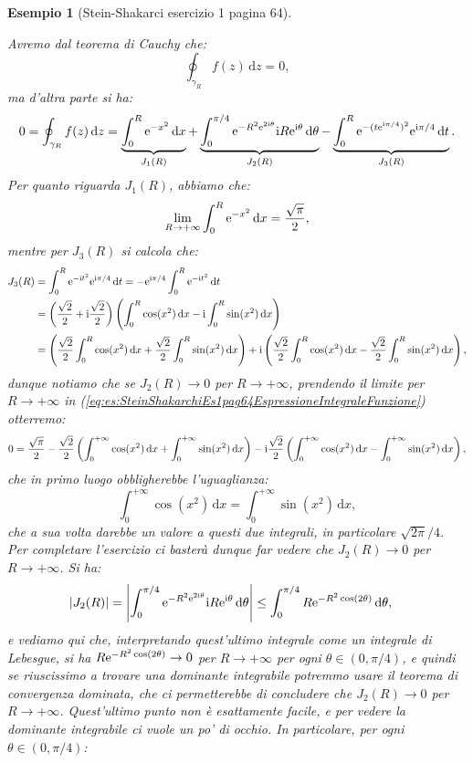 \documentclass[11pt]{book}
\theoremstyle{Definizione}
\theoremstyle{TeoremaProposizioneLemmaCorollarioCongettura}
\theoremstyle{OsservazioneNotaEsempio}
\newtheorem{myes}{Esempio}[section]
\renewcommand{\i}{\textup{i}}
\newcommand{\e}{\textup{e}}
\renewcommand{\d}{\mathrm{d}}
\newcommand{\dz}{\,\d z}
\newcommand{\dt}{\,\d t}
\newcommand{\dx}{\,\d x}
\newcommand{\dtheta}{\, \d \theta}
\begin{document}
\begin{myes}[Stein-Shakarci esercizio 1 pagina 64]
\begin{center}
\end{center}
Avremo dal teorema di Cauchy che:
$$
\oint_{\gamma_R} f(z)\dz = 0,
$$
ma d'altra parte si ha:
\begin{equation}\label{eq:es:SteinShakarchiEs1pag64EspressioneIntegraleFunzione}
0 = \oint_{\gamma_R} f(z)\dz = \underbrace{\int_0^{R} \e^{-x^2}\dx}_{J_1(R)} + \underbrace{\int_0^{\pi/4} \e^{-R^2\e^{2\i\theta}}\i R\e^{\i\theta}\dtheta}_{J_2(R)} - \underbrace{\int_0^R \e^{-(t\e^{\i\pi/4})^2}\e^{\i\pi/4}\dt}_{J_3(R)}.
\end{equation}
Per quanto riguarda $J_1(R)$, abbiamo che:
$$
\lim_{R \to +\infty} \int_0^{R} \e^{-x^2}\dx = \frac{\sqrt{\pi}}{2},
$$
mentre per $J_3(R)$ si calcola che:
\begin{align*}
J_3(R) &= \int_0^{R} \e^{-\i t^2}\e^{\i\pi/4}\dt = -\e^{\i\pi/4}\int_{0}^{R} \e^{-\i t^2}\dt \\
&= \left(\frac{\sqrt{2}}{2}+\i \frac{\sqrt{2}}{2}\right)\left(\int_0^{R} \cos(x^2)\dx - \i \int_0^{R} \sin(x^2)\dx\right)\\
&= \left(\frac{\sqrt{2}}{2}\int_0^R \cos(x^2)\dx +\frac{\sqrt{2}}{2}\int_0^R \sin(x^2)\dx\right)+\i \left(\frac{\sqrt{2}}{2}\int_0^R \cos(x^2)\dx - \frac{\sqrt{2}}{2}\int_0^R \sin(x^2)\dx\right),
\end{align*}
dunque notiamo che se $J_2(R) \to 0$ per $R \to +\infty$, prendendo il limite per $R \to +\infty$ in (\ref{eq:es:SteinShakarchiEs1pag64EspressioneIntegraleFunzione}) otterremo:
$$
0 = \frac{\sqrt{\pi}}{2}-\frac{\sqrt{2}}{2}\left(\int_0^{+\infty} \cos(x^2)\dx + \int_0^{+\infty} \sin(x^2)\dx\right) - \i\frac{\sqrt{2}}{2}\left(\int_0^{+\infty} \cos(x^2)\dx - \int_0^{+\infty} \sin(x^2)\dx\right),
$$
che in primo luogo obbligherebbe l'uguaglianza:
$$
\int_0^{+\infty} \cos(x^2)\dx = \int_0^{+\infty}\sin(x^2)\dx,
$$
che a sua volta darebbe un valore a questi due integrali, in particolare $\sqrt{2\pi}/4$. Per completare l'esercizio ci basterà dunque far vedere che $J_2(R) \to 0$ per $R \to +\infty$. Si ha:
\begin{align*}
|J_2(R)| &= \left|\int_0^{\pi/4} \e^{-R^2\e^{2\i\theta}}\i R \e^{\i\theta}\dtheta\right| \leq \int_0^{\pi/4} R \e^{-R^2 \cos(2\theta)}\dtheta,
\end{align*}
e vediamo qui che, interpretando quest'ultimo integrale come un integrale di Lebesgue, si ha $R \e^{-R^2\cos(2\theta)} \to 0$ per $R \to +\infty$ per  ogni $\theta \in (0,\pi/4)$, e quindi se riuscissimo a trovare una dominante integrabile potremmo usare il teorema di convergenza dominata, che ci permetterebbe di concludere che $J_2(R) \to 0$ per $R \to +\infty$. Quest'ultimo punto non è esattamente facile, e per vedere la dominante integrabile ci vuole un po' di occhio. In particolare, per ogni $\theta\in (0,\pi/4)$:

\end{myes}
\end{document}
